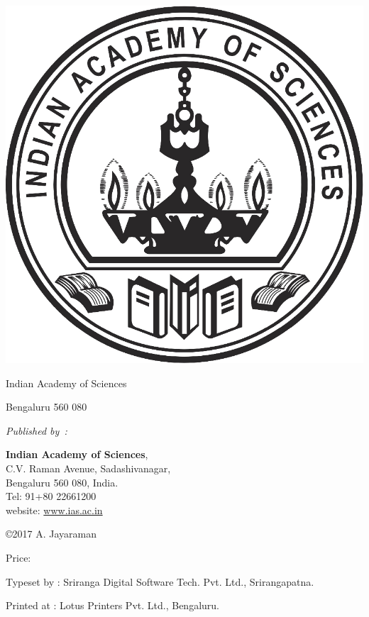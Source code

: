 {\begin{center}
\includegraphics[scale=.2]{eps/IASc_logo.eps}

\medskip

{\sf\Large Indian Academy of Sciences}

\smallskip
{\sf Bengaluru  560 080}

\end{center}

\eject

\thispagestyle{empty}

\noindent
{\em Published by~:}


\noindent
{\bf Indian Academy of Sciences},\\
C.V. Raman Avenue, Sadashivanagar,\\
Bengaluru 560 080, India.\\
Tel: 91+80 22661200\\
website: \url{www.ias.ac.in}

\vskip 1cm

\noindent
{\fontsize{12pt}{14pt}\selectfont
\copyright 2017 A. Jayaraman


\vskip 1.5cm


\vskip 1.5cm
\noindent
Price: 

\vskip 1.5cm
\noindent
}\relax

\vfill

{\fontsize{10pt}{12pt}\selectfont
\noindent
Typeset by : Sriranga Digital Software Tech. Pvt. Ltd., Srirangapatna.

\noindent
Printed at : Lotus Printers Pvt. Ltd., Bengaluru.}\relax

}\relax

